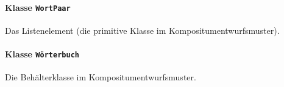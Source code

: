 \documentclass{lehramt-informatik-aufgabe}
\begin{document}
\begin{itemize}
%

\paragraph{Klasse \texttt{WortPaar}}

Das Listenelement (die primitive Klasse im Kompositumentwurfsmuster).

\begin{antwort}
\end{antwort}

%

\paragraph{Klasse \texttt{Wörterbuch}}

Die Behälterklasse im Kompositumentwurfsmuster.

\begin{antwort}
\end{antwort}

\end{itemize}
\end{document}
